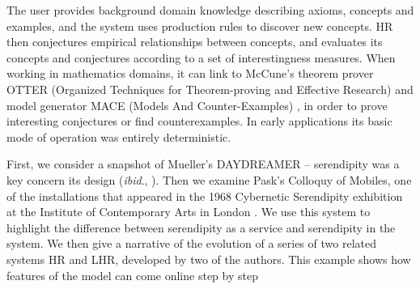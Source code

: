 The user provides background domain knowledge describing axioms, concepts and examples, and the system uses production rules to discover new concepts.  HR then conjectures empirical relationships between concepts, and evaluates its concepts and conjectures according to a set of interestingness measures.  When working in mathematics domains, it can link to McCune's theorem prover {\sf OTTER} (Organized Techniques for Theorem-proving and Effective Research)\cite{mccune:90} and model generator {\sf MACE} (Models And Counter-Examples) \cite{mccune:macemanual,zhang}, in order to prove interesting conjectures or find counterexamples.  In early applications its basic mode of operation was entirely deterministic.

First, we consider a snapshot of Mueller's {\sf DAYDREAMER} \cite{mueller1990} -- serendipity was a key concern its design (\emph{ibid}., ).  Then we examine Pask's {\sf Colloquy of Mobiles}, one of the installations that appeared in the 1968 Cybernetic Serendipity exhibition at the Institute of Contemporary Arts in London
\cite{reichardt1969cybernetic}.  We use this system to highlight the difference between serendipity as a service and serendipity in the system.  We then give a narrative of the evolution of a series of two related systems {\sf HR} and {\sf LHR}, developed by two of the authors.  This example shows how features of the model can come online step by step


\let\oldparagraph\paragraph
\makeatletter
\renewcommand{\paragraph}{%
  \@startsection{paragraph}{4}%
  {\z@}{1ex \@plus 1ex \@minus .2ex}{-1em}%
  {\normalfont\normalsize\itshape}%
}
\makeatother

